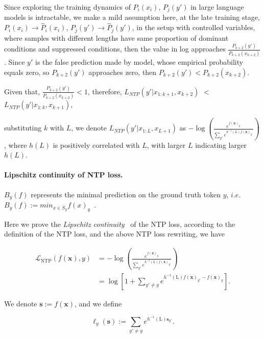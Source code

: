 Since exploring the training dynamics of $P_i(x_i)$, $P_j(y')$ in large language models is intractable, we make a mild assumption here, at the late training stage,  $P_i(x_i)\rightarrow \hat P_i(x_i)$, $P_j(y')\rightarrow \hat P_j(y')$, in the setup with controlled variables, where samples with different lengths have same proportion of dominant conditions and suppressed conditions, then the value in log approaches $\frac{P_{k+2}(y')}{P_{k+2}(x_{k+2})}$. Since $y'$ is the false prediction made by model, whose empirical probability equals zero, so $P_{k+2}(y')$ approaches zero, then $P_{k+2}(y')< P_{k+2}(x_{k+2})$.

Given that, $\frac{P_{k+2}(y')}{P_{k+2}(x_{k+2})} < 1$, therefore, $L_{NTP}(y'|x_{1:k+1},x_{k+2})$ $<$ $L_{NTP}(y'|x_{1:k},x_{k+1})$,

substituting $k$ with $L$, we denote $L_{NTP}(y'|x_{1:L},x_{L+1})$ as $- \log \left( \frac{e^{f(\boldsymbol{x})_y}}{\sum_{y'} e^{h^{-1}(L) f(\boldsymbol{x})_{y'}} } \right)$, where $h(L)$ is positively correlated with $L$, with larger $L$ indicating larger $h(L)$. 


\paragraph{Lipschitz continuity of NTP loss. }
$B_y(f)$ represents the minimal prediction on the ground truth token $y$, $i.e.$ $B_y(f):=min_{x\in S_{y}} f(x)_y$~\cite{wang2024unified}.

Here we prove the \textit{Lipschitz continuity}~\cite{wang2024unified} of the NTP loss, according to the definition of the NTP loss, and the above NTP loss rewriting, we have

\begin{small}
    \begin{equation}
        \begin{aligned}
    \mathcal{L}_\text{NTP}(f(\boldsymbol{x}), y) & = - \log \left( \frac{e^{f(\boldsymbol{x})_y}}{\sum_{y'} e^{h^{-1}(\text{L}) f(\boldsymbol{x})_{y'}} } \right) \\
    & = \log [1 + \sum_{y' \neq y} e^{h^{-1}(\text{L}) f(\boldsymbol{x})_{y'} - f(\boldsymbol{x})_y}].
\end{aligned}
    \end{equation}
\end{small}

We denote \(\boldsymbol{s} := f(\boldsymbol{x})\), and we define

\[
\ell_y(\boldsymbol{s}) := \sum_{y' \neq y} e^{h^{-1}(\text{L}) \boldsymbol{s}_{y'}}.
\]

